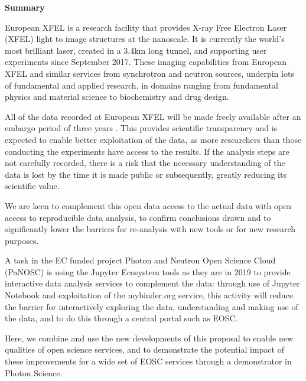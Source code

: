 \begin{task}[
  title=Reproducible photon science workflows at European XFEL,
  id=reproducibility-xfel,
  lead=XFEL,
  PM=36,
  wphases={7-48},
  partners={INSERM,SRL,UPSUD}
  ]

\textbf{Summary}

  European XFEL is a research facility that provides X-ray Free
  Electron Laser (XFEL) light to image structures at the nanoscale. It
  is currently the world's most brilliant laser, created in a 3.4km
  long tunnel, and supporting user experiments since September
  2017. These imaging capabilities from European XFEL and similar
  services from synchrotron and neutron sources, underpin lots of
  fundamental and applied research, in domains ranging from fundamental
  physics and material science to biochemistry and drug design.

  All of the data recorded at European XFEL will be made freely
  available after an embargo period of three years
  \cite{EuXFEL-datapolicy-2017}. This provides scientific transparency
  and is expected to enable better exploitation of the data, as more
  researchers than those conducting the experiments have access to the
  results. If the analysis steps are not carefully recorded, there is a risk
  that the necessary understanding of the data is lost by the time it
  is made public or subsequently, greatly reducing its scientific
  value.

  We are keen to complement this open data access to the actual data
  with open access to reproducible data analysis, to confirm
  conclusions drawn and to significantly lower the barriers for
  re-analysis with new tools or for new research purposes.

  A task in the EC funded project Photon and Neutron Open Science
  Cloud (PaNOSC) is using the Jupyter Ecosystem tools as they are in
  2019 to provide interactive data analysis services to complement the
  data: through use of Jupyter Notebook and exploitation of the
  mybinder.org service, this activity will reduce the barrier for
  interactively exploring the data, understanding and making use of
  the data, and to do this through a central portal such as EOSC.

  Here, we combine and use the new developments of this
  proposal to enable new qualities of open science services, and to
  demonstrate the potential impact of these improvements for a wide
  set of EOSC services through a demonstrator in Photon Science.


\end{task}
